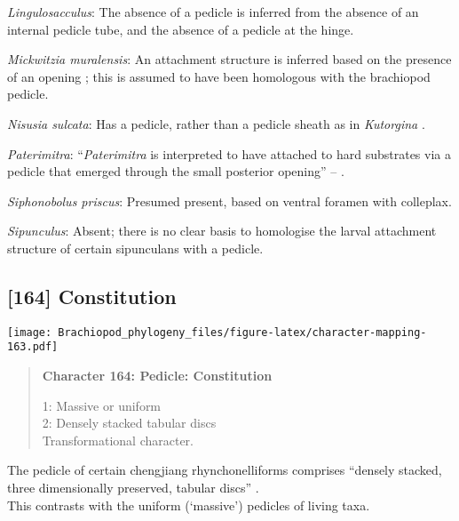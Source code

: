 \documentclass[openany]{book}
\theoremstyle{definition}
\theoremstyle{definition}
\theoremstyle{definition}
\theoremstyle{remark}
\begin{document}
\hypertarget{Lingulosacculus-coding-163}{}
\emph{Lingulosacculus}: The absence of a pedicle is inferred from the
absence of an internal pedicle tube, and the absence of a pedicle at the
hinge.

\hypertarget{Mickwitzia_muralensis-coding-163}{}
\emph{Mickwitzia muralensis}: An attachment structure is inferred based
on the presence of an opening \citep{Balthasar2004Shellstructure}; this
is assumed to have been homologous with the brachiopod pedicle.

\hypertarget{Nisusia_sulcata-coding-163}{}
\emph{Nisusia sulcata}: Has a pedicle, rather than a pedicle sheath as
in \emph{Kutorgina}
\citep{Holmer2018Evolutionarysignificance, Holmer2018Theattachment}.

\hypertarget{Paterimitra-coding-163}{}
\emph{Paterimitra}: ``\emph{Paterimitra} is interpreted to have attached
to hard substrates via a pedicle that emerged through the small
posterior opening'' -- \citet{Skovsted2009Thescleritome}.

\hypertarget{Siphonobolus_priscus-coding-163}{}
\emph{Siphonobolus priscus}: Presumed present, based on ventral foramen
with colleplax.

\hypertarget{Sipunculus-coding-163}{}
\emph{Sipunculus}: Absent; there is no clear basis to homologise the
larval attachment structure of certain sipunculans with a pedicle.

\subsection*{{[}164{]} Constitution}\label{constitution}

\texttt{[image: Brachiopod\_phylogeny\_files/figure-latex/character-mapping-163.pdf]}

\begin{quote}
\textbf{Character 164: Pedicle: Constitution}

1: Massive or uniform\\
2: Densely stacked tabular discs\\
Transformational character.
\end{quote}

The pedicle of certain chengjiang rhynchonelliforms comprises ``densely
stacked, three dimensionally preserved, tabular discs''
\citep{Holmer2018Evolutionarysignificance}.\\
This contrasts with the uniform (`massive') pedicles of living taxa.
\end{document}
